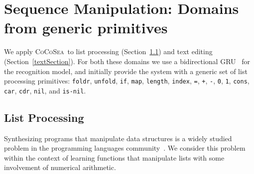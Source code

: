 \documentclass{article}
\newcommand{\system}{\textsc{CoCoSea}~}
\newcommand{\code}[1]{{\footnotesize\texttt{#1}}}
\begin{document}


\section{Sequence Manipulation: Domains from generic primitives}\label{sequences}
We apply \system to list processing (Section~\ref{listSection}) and text editing (Section~\ref{textSection}).
For both these domains we use a bidirectional GRU~\cite{cho2014learning} for
the recognition model, and initially provide the system with a generic set
of list processing primitives:
\code{foldr}, \code{unfold}, \code{if}, \code{map}, \code{length},
\code{index}, \code{=}, \code{+}, \code{-}, \code{0}, \code{1}, \code{cons},
\code{car}, \code{cdr}, \code{nil}, and \code{is-nil}.



\subsection{List Processing}\label{listSection}
Synthesizing programs that manipulate data structures is a widely studied
problem in the programming languages community~\cite{feser2015synthesizing}.
We consider this problem within the context of learning functions that
manipulate lists with some involvement of numerical arithmetic.
\end{document}
